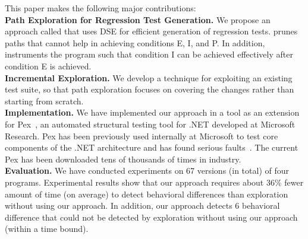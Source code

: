 {

This paper makes the following major contributions:
\\ \textbf{Path Exploration for Regression Test Generation.} We propose an approach called  that uses DSE for efficient generation of regression tests. 
 prunes paths that cannot help in achieving conditions E, I, and P.
In addition,  instruments the program such that condition I can be achieved effectively
after condition E is achieved. 
\\ \textbf{Incremental Exploration.} We develop a technique for exploiting an existing test suite, so that path exploration focuses on covering the changes rather than starting from scratch. 
\\ \textbf{Implementation.} We have implemented our  approach in a tool as an extension for Pex~\cite{Pex},  an automated structural testing tool for .NET developed at Microsoft Research. Pex has been previously used internally at Microsoft to test core components of the .NET architecture and has found serious
faults~\cite{Pex}. The current Pex has been downloaded tens of thousands of times in industry. 
\\ \textbf{Evaluation.} We have conducted experiments on 67 versions (in total) of four programs. 
Experimental results show that our approach requires about 36\% fewer amount of time (on average) to detect behavioral differences than exploration without using our approach. In addition, our approach detects 6 behavioral difference that could not be detected by exploration without using our approach (within a time bound).
}
